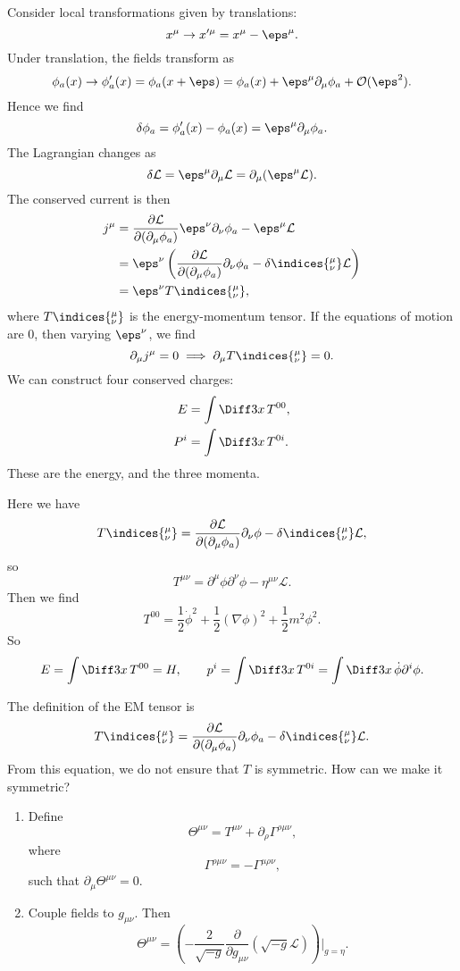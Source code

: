 \documentclass[12pt]{article}
\begin{document}
Consider local transformations given by translations:
\[
x^\mu \to x'^\mu = x^\mu - \eps^\mu.
\]
Under translation, the fields transform as
\[
\phi_a(x) \to \phi_a'(x) = \phi_a(x + \eps) = \phi_a(x) + \eps^\mu \partial_\mu \phi_a + \mathcal{O}(\eps^2).
\]
Hence we find
\[
\delta \phi_a = \phi_a'(x) - \phi_a(x) = \eps^\mu \partial_\mu \phi_a.
\]
The Lagrangian changes as
\[
\delta \mathcal{L} = \eps^\mu \partial_\mu \mathcal{L} = \partial_\mu (\eps^\mu \mathcal{L}).
\]
The conserved current is then
\begin{align*}
	j^\mu &= \frac{\partial \mathcal{L}}{\partial(\partial_\mu \phi_a)} \eps^\nu \partial_\nu \phi_a - \eps^\mu \mathcal{L} \\
	      &= \eps^\nu \left( \frac{\partial \mathcal{L}}{\partial (\partial_\mu \phi_a)} \partial_\nu \phi_a - \delta\indices{^{\mu}_{\nu}} \mathcal{L} \right) \\
	      &= \eps^\nu T\indices{^{\mu}_{\nu}},
\end{align*}
where $T\indices{^{\mu}_{\nu}}$ is the energy-momentum tensor. If the equations of motion are 0, then varying $\eps^\nu$, we find
\[
\partial_\mu j^\mu = 0 \implies \partial_\mu T\indices{^{\mu}_{\nu}} = 0.
\]
We can construct four conserved charges:
\begin{align*}
	E &= \int \Diff3 x \, T^{00}, \\
	P^i &= \int \Diff 3 x \, T^{0i}.
\end{align*}
These are the energy, and the three momenta.

\begin{exbox}
	Here we have
	\[
	T\indices{^{\mu}_{\nu}} = \frac{\partial \mathcal{L}}{\partial (\partial_\mu \phi_a)} \partial_\nu \phi - \delta\indices{^{\mu}_{\nu}} \mathcal{L},
	\]
	so
	\[
	T^{\mu\nu}= \partial^\mu \phi \partial^\nu \phi - \eta^{\mu\nu} \mathcal{L}.
	\]
	Then we find
	\[
	T^{00} = \frac{1}{2} \dot \phi^2 + \frac{1}{2} (\nabla \phi)^2 + \frac{1}{2} m^2 \phi^2.
	\]
	So
	\[
	E = \int \Diff 3 x \, T^{00} = H, \qquad p^i = \int \Diff 3 x \, T^{0i} = \int \Diff 3x \, \dot \phi \partial^i \phi.
	\]
\end{exbox}

\begin{remark}
	The definition of the EM tensor is
	\[
	T\indices{^{\mu}_{\nu}} = \frac{\partial \mathcal{L}}{\partial (\partial_\mu \phi_a)} \partial_\nu \phi_a - \delta\indices{^{\mu}_{\nu}} \mathcal{L}.
	\]
	From this equation, we do not ensure that $T$ is symmetric. How can we make it symmetric?
	\begin{enumerate}
		\item Define
			\[
			\Theta^{\mu\nu} = T^{\mu\nu} + \partial_\rho \Gamma^{\rho\mu\nu},
			\]
			where
			\[
			\Gamma^{\rho\mu\nu}= - \Gamma^{\mu\rho\nu},
			\]
			such that $\partial_\mu \Theta^{\mu\nu} = 0$.
		\item Couple fields to $g_{\mu\nu}$. Then
			\[
			\Theta^{\mu\nu} = \left( - \frac{2}{\sqrt{-g}} \frac{\partial}{\partial g_{\mu\nu}} \left( \sqrt{-g} \mathcal{L} \right) \right) \biggr|_{g = \eta}.
			\]
	\end{enumerate}
	
\end{remark}
\end{document}
